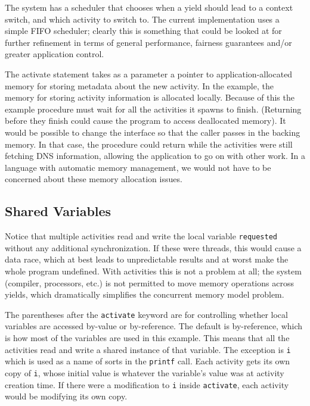 \documentclass[9pt,preprint]{sigplanconf}
\begin{document}
The system has a scheduler that chooses when a yield should lead to a context switch, and which activity to switch to.
The current \charcoal{} implementation uses a simple FIFO scheduler; clearly this is something that could be looked at for further refinement in terms of general performance, fairness guarantees and/or greater application control.

The activate statement takes as a parameter a pointer to application-allocated memory for storing metadata about the new activity.
In the example, the memory for storing activity information is allocated locally.
Because of this the example procedure must wait for all the activities it spawns to finish.
(Returning before they finish could cause the program to access deallocated memory).
It would be possible to change the interface so that the caller passes in the backing memory.
In that case, the procedure could return while the activities were still fetching DNS information, allowing the application to go on with other work.
In a language with automatic memory management, we would not have to be concerned about these memory allocation issues.


\subsection{Shared Variables}

Notice that multiple activities read and write the local variable \texttt{requested} without any additional synchronization.
If these were threads, this would cause a data race, which at best leads to unpredictable results and at worst make the whole program undefined.
With activities this is not a problem at all; the system (compiler, processors, etc.) is not permitted to move memory operations across yields, which dramatically simplifies the concurrent memory model problem.

The parentheses after the \texttt{activate} keyword are for controlling whether local variables are accessed by-value or by-reference.
The default is by-reference, which is how most of the variables are used in this example.
This means that all the activities read and write a shared instance of that variable.
The exception is \texttt{i} which is used as a name of sorts in the \texttt{printf} call.
Each activity gets its own copy of \texttt{i}, whose initial value is whatever the variable's value was at activity creation time.
If there were a modification to \texttt{i} inside \texttt{activate}, each activity would be modifying its own copy.
\end{document}
